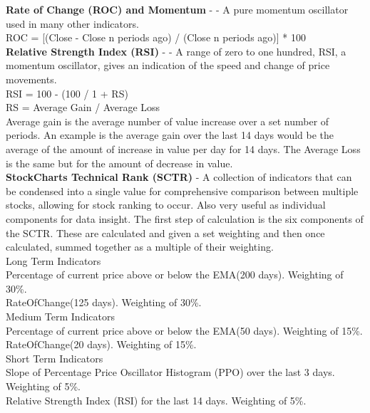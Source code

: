 \documentclass[conference]{IEEEtran}
\begin{document}

\noindent
\textbf{Rate of Change (ROC) and Momentum} - \cite{Murphy1999} - A pure momentum oscillator used in many other indicators.\\

\noindent
ROC = [(Close - Close n periods ago) / (Close n periods ago)] * 100 \\

\noindent
\textbf{Relative Strength Index (RSI)} - \cite{Wilder1978} - A range of zero to one hundred, RSI, a momentum oscillator, gives an indication of the speed and change of price movements.\\

\noindent
RSI = 100 - (100 / 1 + RS) \\
RS = Average Gain / Average Loss\\

Average gain is the average number of value increase over a set number of periods. An example is the average gain over the last 14 days would be the average of the amount of increase in value per day for 14 days. The Average Loss is the same but for the amount of decrease in value.\\

\noindent
\textbf{StockCharts Technical Rank (SCTR)} - A collection of indicators that can be condensed into a single value for comprehensive comparison between multiple stocks, allowing for stock ranking to occur. Also very useful as individual components for data insight. The first step of calculation is the six components of the SCTR. These are calculated and given a set weighting and then once calculated, summed together as a multiple of their weighting. \\

\noindent
Long Term Indicators\\
Percentage of current price above or below the EMA(200 days). Weighting of 30\%. \\
RateOfChange(125 days). Weighting of 30\%. \\

\noindent
Medium Term Indicators\\
Percentage of current price above or below the EMA(50 days). Weighting of 15\%. \\
RateOfChange(20 days). Weighting of 15\%. \\

\noindent
Short Term Indicators\\
Slope of Percentage Price Oscillator Histogram (PPO) over the last 3 days. Weighting of 5\%. \\
Relative Strength Index (RSI) for the last 14 days. Weighting of 5\%. \\
\end{document}
